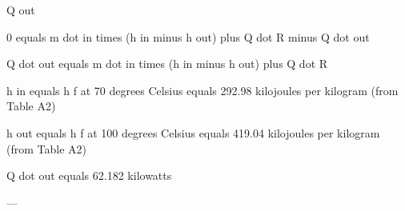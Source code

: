 Q out  

0 equals m dot in times (h in minus h out) plus Q dot R minus Q dot out  

Q dot out equals m dot in times (h in minus h out) plus Q dot R  

h in equals h f at 70 degrees Celsius equals 292.98 kilojoules per kilogram (from Table A2)  

h out equals h f at 100 degrees Celsius equals 419.04 kilojoules per kilogram (from Table A2)  

Q dot out equals 62.182 kilowatts  

---